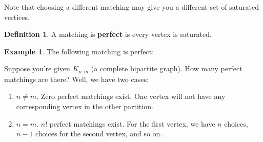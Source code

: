 \documentclass[]{article}
\theoremstyle{definition}
\newtheorem*{defn}{Definition}
\newtheorem{ex}{Example}[section]
\begin{document}
				Note that choosing a different matching may give you a different set of saturated vertices.

				\begin{defn}
					A matching is \textbf{perfect} is every vertex is saturated.
				\end{defn}

				\begin{ex}
					The following matching is perfect:
					\begin{center}
					\end{center}
				\end{ex}

				Suppose you're given $K_{n,m}$ (a complete bipartite graph). How many perfect matchings are there? Well, we have two cases:
				\begin{enumerate}
					\item $n \ne m$. Zero perfect matchings exist. One vertex will not have any corresponding vertex in the other partition.
					\item $n = m$. $n!$ perfect matchings exist. For the first vertex, we have $n$ choices, $n-1$ choices for the second vertex, and so on.
				\end{enumerate}
\end{document}
